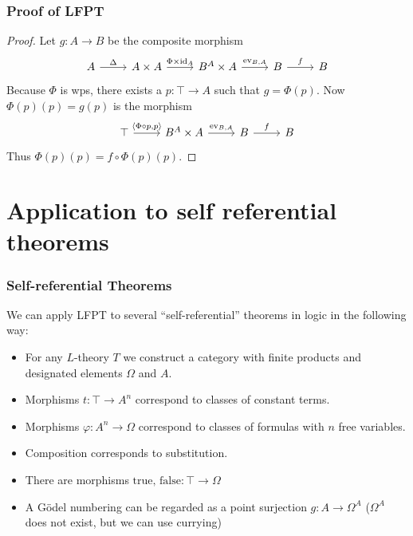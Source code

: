 \documentclass{beamer}
\begin{document}
\begin{frame}[fragile]
  \frametitle{Proof of LFPT}
  \begin{proof}
    Let $g : A \rightarrow B$ be the composite morphism
    \[\begin{tikzcd}
	    A & {A \times A} & {B^A\times A} & {B} & {B}
	    \arrow["\Delta", from=1-1, to=1-2]
	    \arrow["{\Phi \times \text{id}_A}", from=1-2, to=1-3]
	    \arrow["{\text{ev}_{B,A}}", from=1-3, to=1-4]
      \arrow["f", from=1-4, to=1-5]
    \end{tikzcd}\]
    Because $\Phi$ is wps, there exists a $p : \top \rightarrow A$ such that $g = \Phi(p)$. Now $\Phi(p)(p) = g(p)$ is the morphism
    \[\begin{tikzcd}
	    \top & {B^A \times A} & {B} & {B}
	    \arrow["{\langle \Phi \circ p, p \rangle}", from=1-1, to=1-2]
	    \arrow["{\text{ev}_{B,A}}", from=1-2, to=1-3]
      \arrow["f", from=1-3, to=1-4]
    \end{tikzcd}\]
  Thus $\Phi(p)(p) = f \circ \Phi(p)(p)$.
  \end{proof}
\end{frame}

\section{Application to self referential theorems}

\begin{frame}
  \frametitle{Self-referential Theorems}
  We can apply LFPT to several ``self-referential'' theorems in logic in the following way:
  \begin{itemize}
    \item For any $L$-theory $T$ we construct a category with finite products and designated elements $\Omega$ and $A$.
    \item Morphisms $t : \top \rightarrow A^n$ correspond to classes of constant terms.
    \item Morphisms $\varphi : A^n \rightarrow \Omega$ correspond to classes of formulas with $n$ free variables.
    \item Composition corresponds to substitution.
    \item There are morphisms $\text{true, false} : \top \rightarrow \Omega$
    \item A Gödel numbering can be regarded as a point surjection $g : A \rightarrow \Omega ^ A$ ($\Omega ^ A$ does not exist, but we can use currying)
  \end{itemize}
\end{frame}
\end{document}
